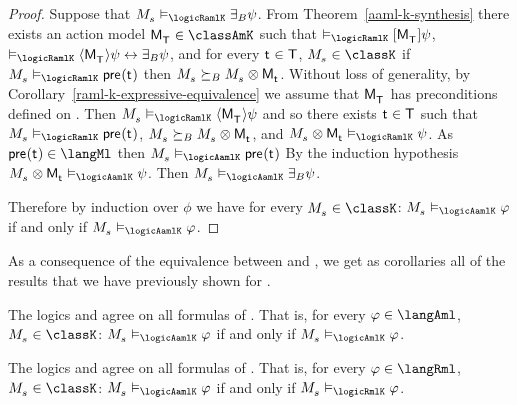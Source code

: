 \begin{proof}
Suppose that $\kPModel{\kStateS} \entails_\logicRamlK \someactsBs \psi$.
From Theorem~\ref{aaml-k-synthesis} there exists an action model $\aPModel{\aStatesT} \in \classAmK$ such that 
$\entails_\logicRamlK \actionA{\aPModel{\aStatesT}} \psi$,
$\entails_\logicRamlK \actionE{\aPModel{\aStatesT}} \psi \iff \someactsBs \psi$, and
for every $\aStateT \in \aStatesT$, $\kPModel{\kStateS} \in \classK$ if $\kPModel{\kStateS} \entails_\logicRamlK \aPrecondition(\aStateT)$ then $\kPModel{\kStateS} \simulatesBs \kPModel{\kStateS} \exec \aPModel{\aStateT}$.
Without loss of generality, by Corollary~\ref{raml-k-expressive-equivalence} we assume that $\aPModel{\aStatesT}$ has preconditions defined on \langMl{}.
Then $\kPModel{\kStateS} \entails_\logicRamlK \actionE{\aPModel{\aStatesT}} \psi$ and so there exists $\aStateT \in \aStatesT$ such that $\kPModel{\kStateS} \entails_\logicRamlK \aPrecondition(\aStateT)$, $\kPModel{\kStateS} \simulatesBs \kPModel{\kStateS} \exec \aPModel{\aStateT}$, and $\kPModel{\kStateS} \exec \aPModel{\aStateT} \entails_\logicRamlK \psi$.
As $\aPrecondition(\aStateT) \in \langMl$ then $\kPModel{\kStateS} \entails_\logicAamlK \aPrecondition(\aStateT)$
By the induction hypothesis $\kPModel{\kStateS} \exec \aPModel{\aStateT} \entails_\logicAamlK \psi$.
Then $\kPModel{\kStateS} \entails_\logicAamlK \someactsBs \psi$.

Therefore by induction over $\phi$ we have for every $\kPModel{\kStateS} \in \classK$: $\kPModel{\kStateS} \entails_\logicAamlK \phi$ if and only if $\kPModel{\kStateS} \entails_\logicAamlK \phi$.
\end{proof}

As a consequence of the equivalence between \logicAamlK{} and \logicRamlK{}, we get as corollaries all of the results that we have previously shown for \logicRamlK{}.

\begin{corollary}
The logics \logicAamlK{} and \logicAmlK{} agree on all formulas of \langAml{}.
That is, for every $\phi \in \langAml$, $\kPModel{\kStateS} \in \classK$: $\kPModel{\kStateS} \entails_\logicAamlK \phi$ if and only if $\kPModel{\kStateS} \entails_\logicAmlK \phi$.
\end{corollary}

\begin{corollary}
The logics \logicAamlK{} and \logicRmlK{} agree on all formulas of \langRml{}.
That is, for every $\phi \in \langRml$, $\kPModel{\kStateS} \in \classK$: $\kPModel{\kStateS} \entails_\logicAamlK \phi$ if and only if $\kPModel{\kStateS} \entails_\logicRmlK \phi$.
\end{corollary}

